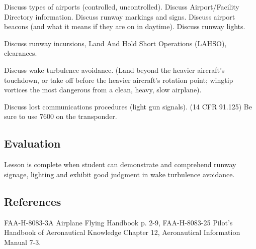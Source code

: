 Discuss types of airports (controlled, uncontrolled). Discuss Airport/Facility
Directory information. Discuss runway markings and signs. Discuss airport
beacons (and what it means if they are on in daytime). Discuss runway lights.

Discuss runway incursions, Land And Hold Short Operations (LAHSO), clearances.

Discuss wake turbulence avoidance. (Land beyond the heavier aircraft's
touchdown, or take off before the heavier aircraft's rotation point; wingtip
vortices the most dangerous from a clean, heavy, slow airplane).

Discuss lost communications procedures (light gun signals). (14 CFR 91.125) Be
sure to use 7600 on the transponder.

\subsection{Evaluation}

Lesson is complete when student can demonstrate and comprehend runway signage,
lighting and exhibit good judgment in wake turbulence avoidance.

\subsection{References}

FAA-H-8083-3A Airplane Flying Handbook p. 2-9, FAA-H-8083-25 Pilot's Handbook
of Aeronautical Knowledge Chapter 12, Aeronautical Information Manual 7-3.

